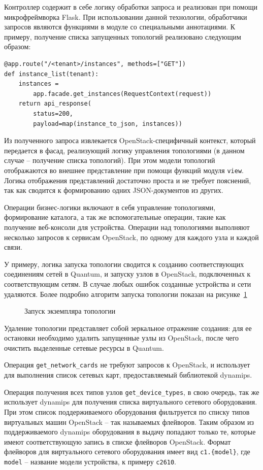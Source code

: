 Контроллер содержит в себе логику обработки запроса и реализован при помощи микрофреймворка
Flask. При использовании данной технологии, обработчики запросов являются функциями в модуле
со специальными аннотациями. К примеру, получение списка запущенных топологий реализовано
следующим образом:
\begin{lstlisting}
@app.route("/<tenant>/instances", methods=["GET"])
def instance_list(tenant):
    instances = 
        app.facade.get_instances(RequestContext(request))
    return api_response(
        status=200, 
        payload=map(instance_to_json, instances))
\end{lstlisting}
Из полученного запроса извлекается OpenStack-специфичный контекст, который передается
в фасад, реализующий логику управления топологиями (в данном случае -- получение списка 
топологий). При этом модели топологий отображаются во внешнее представление
при помощи функций модуля \verb`view`. Логика отображения представлений достаточно
проста и не требует пояснений, так как сводится к формированию одних JSON-документов из других.

Операции бизнес-логики включают в себя управление топологиями, формирование каталога,
а так же вспомогательные операции, такие как получение веб-консоли для устройства.
Операции над топологиями выполняют несколько запросов к сервисам OpenStack, по одному для 
каждого узла и каждой связи.

У примеру, логика запуска топологии сводится к созданию соответствующих соединениям сетей в 
Quantum, и запуску узлов в OpenStack, подключенных к соответствующим сетям. В случае любых 
ошибок созданные устройства и сети удаляются.
Более подробно алгоритм запуска топологии показан на рисунке~\ref{fig:launch-instance-flow}
\begin{figure}
  \centering
  {\footnotesize}
  \caption{Запуск экземпляра топологии}
  \label{fig:launch-instance-flow}
\end{figure} 

Удаление топологии представляет собой зеркальное отражение создания: для ее остановки 
необходимо удалить запущенные узлы из OpenStack, после чего очистить выделенные сетевые
ресурсы в Quantum.

Операция \verb`get_network_cards` не требуют запросов к OpenStack, и использует для выполнения 
список сетевых карт, предоставляемый библиотекой dynamips.

Операция получения всех типов узлов \verb`get_device_types`, в свою очередь,
так же использует dynamips для получения списка виртуального сетевого оборудования.
При этом список поддерживаемого оборудования фильтруется по списку типов виртуальных
машин OpenStack -- так называемых флейворов. Таким образом из поддерживаемого
dynamips оборудования в выдачу попадают только те, которые имеют соответствующую запись
в списке флейворов OpenStack. Формат флейворов для виртуального сетевого оборудования 
имеет вид \verb`c1.{model}`, где \verb`model` -- название модели устройства, к примеру 
\verb`c2610`.

